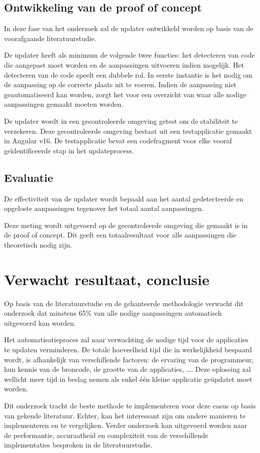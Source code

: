 \subsection{Ontwikkeling van de proof of concept}

In deze fase van het onderzoek zal de updater ontwikkeld worden op basis van de voorafgaande literatuurstudie.

De updater heeft als minimum de volgende twee functies: het detecteren van code die aangepast moet worden en de aanpassingen uitvoeren indien mogelijk.
Het detecteren van de code speelt een dubbele rol.
In eerste instantie is het nodig om de aanpassing op de correcte plaats uit te voeren.
Indien de aanpassing niet geautomatiseerd kan worden, zorgt het voor een overzicht van waar alle nodige aanpassingen gemaakt moeten worden.

De updater wordt in een gecontroleerde omgeving getest om de stabiliteit te verzekeren.
Deze gecontroleerde omgeving bestaat uit een testapplicatie gemaakt in Angular v16.
De testapplicatie bevat een codefragment voor elke vooraf geïdentificeerde stap in het updateprocess.

\subsection{Evaluatie}

De effectiviteit van de updater wordt bepaald aan het aantal gedetecteerde en opgeloste aanpassingen tegenover het totaal aantal aanpassingen.

Deze meting wordt uitgevoerd op de gecontroleerde omgeving die gemaakt is in de proof of concept.
Dit geeft een totaalresultaat voor alle aanpassingen die theoretisch nodig zijn.

\section{Verwacht resultaat, conclusie}
\label{sec:verwachte_resultaten}

Op basis van de literatuurstudie en de gehanteerde methodologie verwacht dit onderzoek dat minstens 65\% van alle nodige aanpassingen automatisch uitgevoerd kan worden.

Het automatisatieproces zal naar verwachting de nodige tijd voor de applicaties te updaten verminderen.
De totale hoeveelheid tijd die in werkelijkheid bespaard wordt, is afhankelijk van verschillende factoren: de ervaring van de programmeur, hun kennis van de broncode, de grootte van de applicaties, \dots.
Deze oplossing zal wellicht meer tijd in beslag nemen als enkel één kleine applicatie geüpdatet moet worden.

Dit onderzoek tracht de beste methode te implementeren voor deze casus op basis van gekende literatuur.
Echter, kan het interessant zijn om andere manieren te implementeren en te vergelijken.
Verder onderzoek kan uitgevoerd worden naar de performantie, accuraatheid en complexiteit van de verschillende implementaties besproken in de literatuurstudie.

